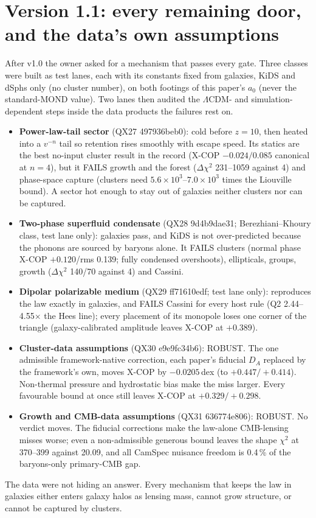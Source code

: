 \documentclass[10pt]{article}
\begin{document}
\section{Version 1.1: every remaining door, and the data's own assumptions}
After v1.0 the owner asked for a mechanism that passes every gate. Three classes were built as test lanes, each with its constants fixed from galaxies, KiDS and dSphs only (no cluster number), on both footings of this paper's $a_0$ (never the standard-MOND value). Two lanes then audited the $\Lambda$CDM- and simulation-dependent steps inside the data products the failures rest on.
\begin{itemize}
\item \textbf{Power-law-tail sector} (QX27 497936beb0): cold before $z=10$, then heated into a $v^{-n}$ tail so retention rises smoothly with escape speed. Its statics are the best no-input cluster result in the record (X-COP $-0.024/0.085$ canonical at $n=4$), but it FAILS growth and the forest ($\Delta\chi^2$ 231--1059 against 4) and phase-space capture (clusters need $5.6\times10^3$--$7.0\times10^3$ times the Liouville bound). A sector hot enough to stay out of galaxies neither clusters nor can be captured.
\item \textbf{Two-phase superfluid condensate} (QX28 9d4b9dae31; Berezhiani--Khoury class, test lane only): galaxies pass, and KiDS is not over-predicted because the phonons are sourced by baryons alone. It FAILS clusters (normal phase X-COP $+0.120$/rms 0.139; fully condensed overshoots), ellipticals, groups, growth ($\Delta\chi^2$ 140/70 against 4) and Cassini.
\item \textbf{Dipolar polarizable medium} (QX29 ff71610edf; test lane only): reproduces the law exactly in galaxies, and FAILS Cassini for every host rule (Q2 2.44--4.55$\times$ the Hees line); every placement of its monopole loses one corner of the triangle (galaxy-calibrated amplitude leaves X-COP at $+0.389$).
\item \textbf{Cluster-data assumptions} (QX30 e9e9fc34b6): ROBUST. The one admissible framework-native correction, each paper's fiducial $D_A$ replaced by the framework's own, moves X-COP by $-0.0205$\,dex (to $+0.447/+0.414$). Non-thermal pressure and hydrostatic bias make the miss larger. Every favourable bound at once still leaves X-COP at $+0.329/+0.298$.
\item \textbf{Growth and CMB-data assumptions} (QX31 636774e806): ROBUST. No verdict moves. The fiducial corrections make the law-alone CMB-lensing misses worse; even a non-admissible generous bound leaves the shape $\chi^2$ at 370--399 against 20.09, and all CamSpec nuisance freedom is 0.4\,\% of the baryons-only primary-CMB gap.
\end{itemize}
The data were not hiding an answer. Every mechanism that keeps the law in galaxies either enters galaxy halos as lensing mass, cannot grow structure, or cannot be captured by clusters.
\end{document}
